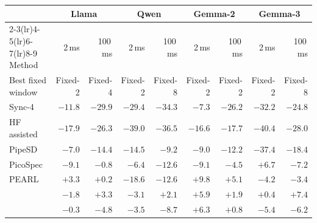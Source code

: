 \begin{tabular}{@{}lrrrrrrrr@{}}
\toprule
 & \multicolumn{2}{c}{Llama} & \multicolumn{2}{c}{Qwen} & \multicolumn{2}{c}{Gemma-2} & \multicolumn{2}{c}{Gemma-3}\\
\cmidrule(lr){2-3}\cmidrule(lr){4-5}\cmidrule(lr){6-7}\cmidrule(lr){8-9}
Method & 2\,ms & 100\,ms & 2\,ms & 100\,ms & 2\,ms & 100\,ms & 2\,ms & 100\,ms\\
\midrule
Best fixed window & Fixed-2 & Fixed-4 & Fixed-2 & Fixed-8 & Fixed-2 & Fixed-2 & Fixed-2 & Fixed-8 \\
\midrule
Sync-4 & $-11.8$ & $-29.9$ & $-29.4$ & $-34.3$ & $-7.3$ & $-26.2$ & $-32.2$ & $-24.8$ \\
HF assisted & $-17.9$ & $-26.3$ & $-39.0$ & $-36.5$ & $-16.6$ & $-17.7$ & $-40.4$ & $-28.0$ \\
PipeSD & $-7.0$ & $-14.4$ & $-14.5$ & $-9.2$ & $-9.0$ & $-12.2$ & $-37.4$ & $-18.4$ \\
PicoSpec & $-9.1$ & $-0.8$ & $-6.4$ & $-12.6$ & $-9.1$ & $-4.5$ & $+6.7$ & $-7.2$ \\
PEARL & $+3.3$ & $+0.2$ & $-18.6$ & $-12.6$ & $+9.8$ & $+5.1$ & $-4.2$ & $-3.4$ \\
\textbf{\capes{}} & $-1.8$ & $+3.3$ & $-3.1$ & $+2.1$ & $+5.9$ & $+1.9$ & $+0.4$ & $+7.4$ \\
\textbf{\capee{}} & $-0.3$ & $-4.8$ & $-3.5$ & $-8.7$ & $+6.3$ & $+0.8$ & $-5.4$ & $-6.2$ \\
\bottomrule
\end{tabular}

